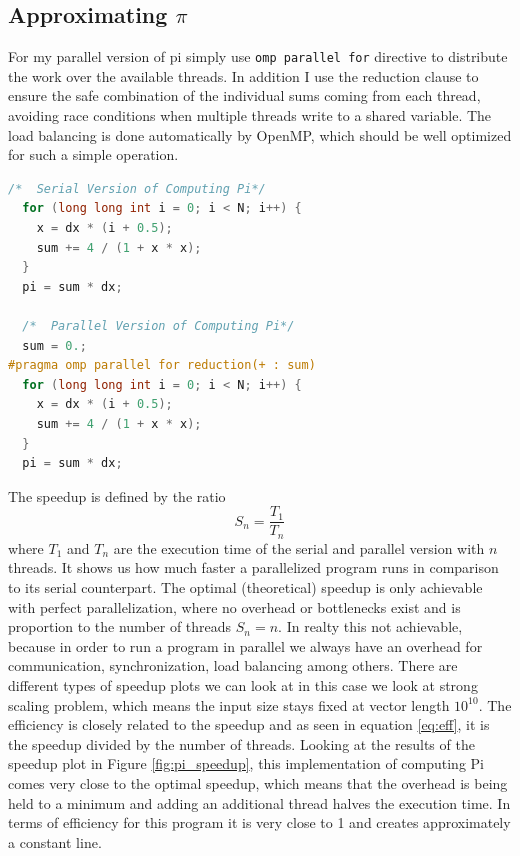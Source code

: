 \subsection{Approximating $\pi$}
For my parallel version of pi simply use \texttt{omp parallel for} directive to distribute the work over the available threads. In addition I use the reduction clause to ensure the safe combination of the individual sums coming from each thread, avoiding race conditions when multiple threads write to a shared variable. The load balancing is done automatically by OpenMP, which should be well optimized for such a simple operation. 
\begin{lstlisting}[language=C++, caption=Serial and Parallel implementation of Pi, label=lst:pi]
  /*  Serial Version of Computing Pi*/
  for (long long int i = 0; i < N; i++) {
    x = dx * (i + 0.5);
    sum += 4 / (1 + x * x);
  }
  pi = sum * dx;

  /*  Parallel Version of Computing Pi*/
  sum = 0.;
#pragma omp parallel for reduction(+ : sum)
  for (long long int i = 0; i < N; i++) {
    x = dx * (i + 0.5);
    sum += 4 / (1 + x * x);
  }
  pi = sum * dx;
\end{lstlisting}
The speedup is defined by the ratio
\begin{equation}
	S_n = \frac{T_1}{T_n}
\end{equation}
where $T_1$ and $T_n$ are the execution time of the serial and parallel version with $n$ threads.
It shows us how much faster a parallelized program runs in comparison to its serial counterpart.
The optimal (theoretical) speedup is only achievable with perfect parallelization, where no overhead or bottlenecks exist and is proportion to the number of threads $S_n = n$. In realty this not achievable, because in order to run a program in parallel we always have an overhead for communication, synchronization, load balancing among others.
There are different types of speedup plots we can look at in this case we look at strong scaling problem, which means the input size stays fixed at vector length $10^{10}$. \newline
The efficiency is closely related to the speedup and as seen in equation \ref{eq:eff}, it is the speedup divided by the number of threads.\newline
\newline
Looking at the results of the speedup plot in Figure \ref{fig:pi_speedup}, this implementation of computing Pi comes very close to the optimal speedup, which means that the overhead is being held to a minimum and adding an additional thread halves the execution time. In terms of efficiency for this program it is very close to 1 and creates approximately a constant line. 
